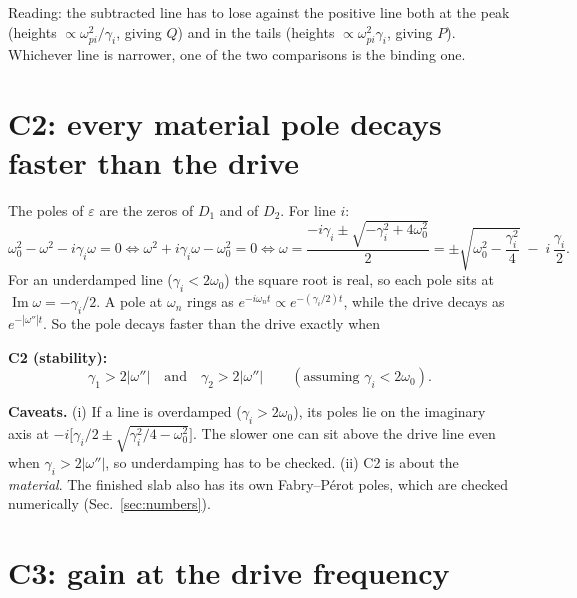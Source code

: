 \documentclass[11pt]{article}
\newcommand{\wi}{|\omega''|}          %
\renewcommand{\Im}{\operatorname{Im}}
\begin{document}
Reading: the subtracted line has to lose against the positive line both at the peak (heights $\propto\omega_{pi}^2/\gamma_i$, giving $Q$) and in the tails (heights $\propto\omega_{pi}^2\gamma_i$, giving $P$).
Whichever line is narrower, one of the two comparisons is the binding one.

\section{C2: every material pole decays faster than the drive}

The poles of $\varepsilon$ are the zeros of $D_1$ and of $D_2$. For line $i$:
\begin{equation}
  \omega_0^2-\omega^2-i\gamma_i\omega = 0
  \iff \omega^2 + i\gamma_i\omega - \omega_0^2 = 0
  \iff \omega = \frac{-i\gamma_i \pm\sqrt{-\gamma_i^2+4\omega_0^2}}{2}
  = \pm\sqrt{\omega_0^2-\frac{\gamma_i^2}{4}} \;-\; i\,\frac{\gamma_i}{2}.
\end{equation}
For an underdamped line ($\gamma_i<2\omega_0$) the square root is real, so each pole sits at $\Im\omega = -\gamma_i/2$.
A pole at $\omega_n$ rings as $e^{-i\omega_n t}\propto e^{-(\gamma_i/2)t}$, while the drive decays as $e^{-\wi t}$. So the pole decays faster than the drive exactly when
\begin{result}
\textbf{C2 (stability):}
\begin{equation}
  \gamma_1 > 2\wi \quad\text{and}\quad \gamma_2 > 2\wi
  \qquad(\text{assuming } \gamma_i < 2\omega_0).
  \label{eq:C2}
\end{equation}
\end{result}
\begin{aside}
\textbf{Caveats.} (i) If a line is overdamped ($\gamma_i>2\omega_0$), its poles lie on the imaginary axis at
$-i\big[\gamma_i/2\pm\sqrt{\gamma_i^2/4-\omega_0^2}\big]$. The slower one can sit above the drive line even when $\gamma_i>2\wi$, so underdamping has to be checked.
(ii) C2 is about the \emph{material}. The finished slab also has its own Fabry--P\'erot poles, which are checked numerically (Sec.~\ref{sec:numbers}).
\end{aside}

\section{C3: gain at the drive frequency}
\end{document}
